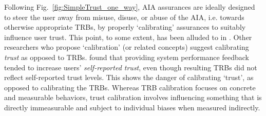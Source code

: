     Following Fig.~\ref{fig:SimpleTrust_one_way}, AIA assurances are ideally designed to steer the user away from misuse, disuse, or abuse of the AIA, i.e. towards otherwise appropriate TRBs, by properly `calibrating' assurances to suitably influence user trust. This point, to some extent, has been alluded to in \cite{Muir1994-ow,Lillard2016-yg,Lee2004-pv,Hutchins2015-if}. Other researchers who propose `calibration' (or related concepts) suggest calibrating \emph{trust} as opposed to TRBs. \citet{Dzindolet2003-ts} found that providing system performance feedback tended to increase users' \textit{self-reported trust}, even though resulting TRBs did not reflect self-reported trust levels. This shows the danger of calibrating `trust', as opposed to calibrating the TRBs. Whereas TRB calibration focuses on concrete and measurable behaviors, trust calibration involves influencing something that is directly immeasurable and subject to individual biases when measured indirectly. 